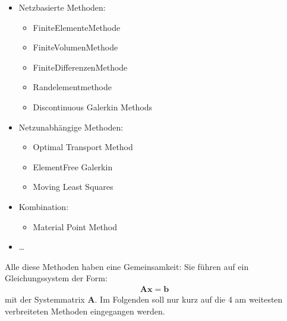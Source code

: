 \documentclass[letterpaper,10pt,german]{jupyterBook}
\begin{document}
\begin{itemize}
\item {} 
\sphinxAtStartPar
Netzbasierte Methoden:
\begin{itemize}
\item {} 
\sphinxAtStartPar
Finite\sphinxhyphen{}Elemente\sphinxhyphen{}Methode 

\item {} 
\sphinxAtStartPar
Finite\sphinxhyphen{}Volumen\sphinxhyphen{}Methode 

\item {} 
\sphinxAtStartPar
Finite\sphinxhyphen{}Differenzen\sphinxhyphen{}Methode 

\item {} 
\sphinxAtStartPar
Randelementmethode 

\item {} 
\sphinxAtStartPar
Discontinuous Galerkin Methods 

\end{itemize}

\item {} 
\sphinxAtStartPar
Netzunabhängige Methoden:
\begin{itemize}
\item {} 
\sphinxAtStartPar
Optimal Transport Method 

\item {} 
\sphinxAtStartPar
Element\sphinxhyphen{}Free Galerkin 

\item {} 
\sphinxAtStartPar
Moving Least Squares 

\end{itemize}

\item {} 
\sphinxAtStartPar
Kombination:
\begin{itemize}
\item {} 
\sphinxAtStartPar
Material Point Method 

\end{itemize}

\item {} 
\sphinxAtStartPar
…

\end{itemize}

\sphinxAtStartPar
Alle diese Methoden haben eine Gemeinsamkeit: Sie führen auf ein Gleichungssystem der Form:
\begin{equation}\label{equation:chapters/chapter1/Einführung_Loesungsverfahren:LGS}
\begin{split}\boldsymbol{Ax}=\boldsymbol{b} \end{split}
\end{equation}
\sphinxAtStartPar
mit der Systemmatrix \(\boldsymbol{A}\). Im Folgenden soll nur kurz auf die 4 am weitesten verbreiteten Methoden eingegangen werden.
\end{document}

